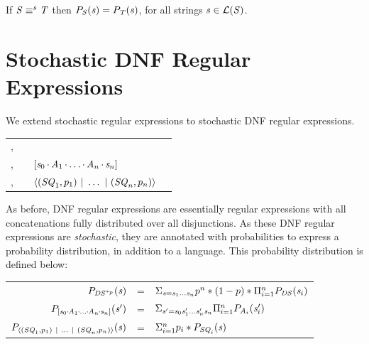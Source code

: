 \documentclass[acmsmall,screen,anonymous]{acmart}
\begin{document}
\begin{theorem}
  If $\mathit{S} \equiv^s \mathit{T}$ then $P_{\mathit{S}}(\mathit{s}) =
  P_{\mathit{T}}(\mathit{s})$, for all strings $\mathit{s} \in \mathcal{L}(\mathit{S})$.
\end{theorem}

\section{Stochastic DNF Regular Expressions}
\label{sec:dnf-regex-lens}
We extend stochastic regular expressions to stochastic DNF regular expressions.
\begin{center}
  \begin{tabular}{l@{\ }c@{\ }l@{\ }>{\itshape\/}r}
    \Atom{},\AtomAlt{} & \GEq{} & \PRegexStar{\DNFRegex{}}{\Probability}
\\
    \Sequence{},\SequenceAlt{} & \GEq{} &
                                                       $[\mathit{s}_0\mkern-1mu\cdot\mkern-1mu\mathit{A}_1\mkern-1mu\cdot\mkern-1mu\ldots\mkern-1mu\cdot\mkern-1mu\mathit{A}_n\mkern-1mu\cdot\mkern-1mu\mathit{s}_n]$ 
\\
    \DNFRegex{},\DNFRegexAlt{} & \GEq{} & $\langle(\mathit{SQ}_1,p_1)~|~\ldots~|~(\mathit{SQ}_n,p_n)\rangle$ %
  \end{tabular}
\end{center}

As before, DNF regular expressions are essentially regular expressions with all
concatenations fully distributed over all disjunctions.  As these DNF regular
expressions are \emph{stochastic}, they are annotated with probabilities to
express a probability distribution, in addition to a language.  This probability
distribution is defined below:

\begin{center}
  \begin{tabular}{rcl}
    $P_{\mathit{DS}^{*_{p}}}(\mathit{s})$
    & =
    & $\Sigma_{\mathit{s} = \mathit{s}_1 \ldots \mathit{s}_n}p^n*(1-p)*\Pi_{i=1}^nP_{\mathit{DS}}(\mathit{s}_i)$\\
    
    $P_{[\mathit{s}_0 \mkern-1mu\cdot\mkern-1mu \mathit{A}_1 \mkern-1mu\cdot\mkern-1mu \ldots \mkern-1mu\cdot\mkern-1mu \mathit{A}_n \mkern-1mu\cdot\mkern-1mu \mathit{s}_n]}(\mathit{s}')$
    & =
    & $\Sigma_{\mathit{s}' = \mathit{s}_0\mathit{s}_1'\ldots\mathit{s}_n'\mathit{s}_n}\Pi_{i = 1}^nP_{\mathit{A}_i}(\mathit{s}_i')$ \\
    
    $P_{\langle(\mathit{SQ}_1,p_1) ~|~ \ldots ~|~ (\mathit{SQ}_n,p_n)\rangle}(\mathit{s})$
    & =
    & $\Sigma_{i=1}^np_i * P_{\mathit{SQ}_i}(\mathit{s})$\\
  \end{tabular}
\end{center}
\end{document}
